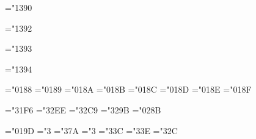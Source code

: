 
%


\def\ldbrack{\delimiter"4182382}
\def\rdbrack{\delimiter"5183383}


\mathchardef\surfintop="1390 
\def\surfint{\surfintop\nolimits}


\mathchardef\midintop="1392 
\def\midint{\midintop\nolimits}

\mathchardef\midointop="1393 
\def\midoint{\midointop\nolimits}

\mathchardef\midsurfintop="1394 
\def\midsurfint{\midsurfintop\nolimits}


\def\largeint{\delimiter"135A395}


\mathchardef\dblint  ="0188
\mathchardef\trplint ="0189
\mathchardef\contint ="018A
\mathchardef\surfint ="018B
\mathchardef\volint  ="018C
\mathchardef\clwint  ="018D
\mathchardef\cclwcint="018E
\mathchardef\clwcint ="018F


\def\joinrel{\mathrel{\mkern-4mu}} 


\mathchardef\bowtie="31F6
\mathchardef\models="32EE
\mathchardef\doteq ="32C9
\mathchardef\cong  ="329B
\mathchardef\angle ="028B



\mathchardef\hbar             ="019D
\mathchardef\neq              ="3
\mathchardef\rightleftharpoons="3\thearfam 7A
\mathchardef\leftrightharpoons="3
\mathchardef\hookleftarrow    ="3\thearfam 3C
\mathchardef\hookrightarrow   ="3\thearfam 3E
\mathchardef\mapsto           ="3\thearfam 2C

